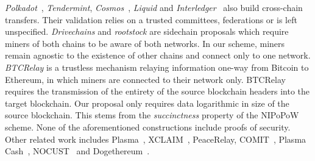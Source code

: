 \emph{Polkadot}~\cite{polkadot}, \emph{Tendermint},
\emph{Cosmos}~\cite{tendermint}, \emph{Liquid} and
\emph{Interledger}~\cite{interledger} also build cross-chain transfers. Their
validation relies on a trusted committees, federations or is left unspecified.
\emph{Drivechains} and \emph{rootstock} are sidechain proposals which require
miners of both chains to be aware of both networks. In our scheme, miners remain
agnostic to the existence of other chains and connect only to one network.
\emph{BTCRelay} is a trustless mechanism relaying information one-way from
Bitcoin to Ethereum, in which miners are connected to their network only.
BTCRelay requires the transmission of the entirety of the source blockchain
headers into the target blockchain. Our proposal only requires data logarithmic
in size of the source blockchain. This stems from the \emph{succinctness}
property of the NIPoPoW scheme.
None of the aforementioned constructions include
proofs of security.
Other related work includes Plasma~\cite{plasma},
XCLAIM~\cite{xclaim}, PeaceRelay, COMIT~\cite{comit}, Plasma Cash~\cite{plasmacash},
NOCUST~\cite{nocust} and Dogethereum~\cite{dogethereum}.

